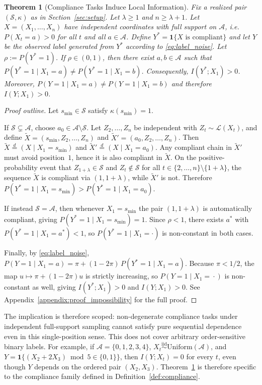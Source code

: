 \documentclass{article}
\theoremstyle{plain}
\newtheorem{theorem}{Theorem}[section]
\theoremstyle{definition}
\theoremstyle{remark}
\begin{document}
\begin{theorem}[Compliance Tasks Induce Local Information]
\label{thm:impossibility}
Fix a realized pair $(\mathcal{S},\kappa)$ as in Section~\ref{sec:setup}.
Let $\lambda \ge 1$ and $n \ge \lambda+1$.
Let $X=(X_1,\ldots,X_n)$ have independent coordinates with full support on
$\mathcal{A}$, i.e.\ $P(X_t=a)>0$ for all $t$ and all $a\in\mathcal{A}$.
Define
$Y^* = \mathbf{1}\{X \text{ is compliant}\}$
and let $Y$ be the observed label generated from $Y^*$ according to
\eqref{eq:label_noise}. Let $\rho := P(Y^*=1)$.
If $\rho\in(0,1)$, then there exist $a,b\in\mathcal{A}$ such that
$P(Y^*=1\mid X_1=a)\neq P(Y^*=1\mid X_1=b)$.
Consequently, $I(Y^*;X_1)>0$.
Moreover, $P(Y=1\mid X_1=a)\neq P(Y=1\mid X_1=b)$
and therefore $I(Y;X_1)>0$.
\end{theorem}

\begin{proof}[Proof outline]
Let $s_{\min}\in\mathcal{S}$ satisfy $\kappa(s_{\min})=1$.

If $\mathcal{S}\subsetneq\mathcal{A}$, choose $a_0\in\mathcal{A}\setminus\mathcal{S}$.
Let $Z_2,\ldots,Z_n$ be independent with
$Z_t\sim\mathcal{L}(X_t)$, and define
$\widetilde X=(s_{\min},Z_2,\ldots,Z_n)$ and
$\widetilde X'=(a_0,Z_2,\ldots,Z_n)$.
Then
$\widetilde X \stackrel{d}{=} (X\mid X_1=s_{\min})$ and
$\widetilde X' \stackrel{d}{=} (X\mid X_1=a_0)$.
Any compliant chain in $\widetilde X'$ must avoid position~$1$, hence it is
also compliant in $\widetilde X$. On the positive-probability event
that $Z_{1+\lambda}\in\mathcal{S}$ and
$Z_t\notin\mathcal{S}$ for all
$t\in\{2,\ldots,n\}\setminus\{1+\lambda\}$,
the sequence $\widetilde X$ is compliant via $(1,1+\lambda)$,
while $\widetilde X'$ is not. Therefore
$P(Y^*\!=\!1\mid X_1\!=\!s_{\min}) > P(Y^*\!=\!1\mid X_1\!=\!a_0)$.

If instead $\mathcal{S}=\mathcal{A}$, then whenever $X_1=s_{\min}$ the pair
$(1,1+\lambda)$ is automatically compliant, giving
$P(Y^*=1\mid X_1=s_{\min})=1$.
Since $\rho<1$, there exists $a^*$ with
$P(Y^*=1\mid X_1=a^*)<1$,
so $P(Y^*=1\mid X_1=\cdot)$ is non-constant in both cases.

Finally, by \eqref{eq:label_noise},
$P(Y\!=\!1\mid X_1\!=\!a)
= \pi + (1-2\pi)\,P(Y^*\!=\!1\mid X_1\!=\!a)$.
Because $\pi<1/2$, the map
$u\mapsto \pi+(1-2\pi)u$ is strictly increasing, so
$P(Y\!=\!1\mid X_1\!=\!\cdot)$ is non-constant as well, giving
$I(Y^*;X_1)>0$ and $I(Y;X_1)>0$.
See Appendix~\ref{appendix:proof_impossibility} for the full proof.
\end{proof}
The implication is therefore scoped: non-degenerate compliance tasks under
independent full-support sampling cannot satisfy pure sequential dependence
even in this single-position sense. This does not cover arbitrary
order-sensitive binary labels. For example, if
$\mathcal{A}=\{0,1,2,3,4\}$,
$X_t \overset{\mathrm{iid}}{\sim} \mathrm{Uniform}(\mathcal{A})$, and
$Y=\mathbf{1}\{(X_2+2X_3)\bmod 5 \in \{0,1\}\}$,
then $I(Y;X_t)=0$ for every $t$, even though $Y$ depends on the ordered pair
$(X_2,X_3)$. Theorem~\ref{thm:impossibility} is therefore specific to the
compliance family defined in Definition~\ref{def:compliance}.
\end{document}
